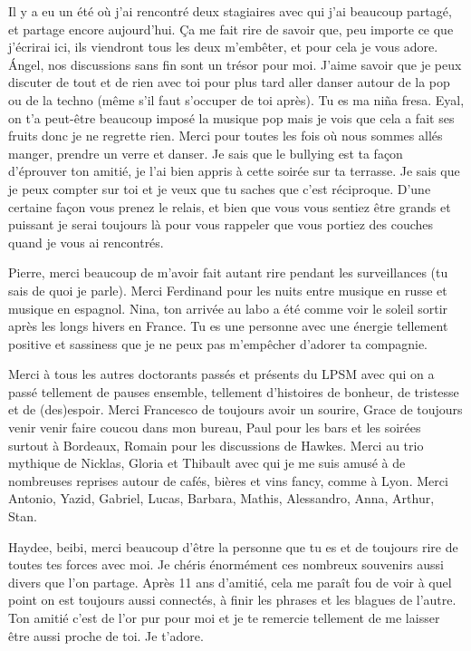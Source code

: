 Il y a eu un été où j’ai rencontré deux stagiaires avec qui j’ai beaucoup partagé, et partage encore aujourd’hui. Ça me fait rire de savoir que, peu importe ce que j’écrirai ici, ils viendront tous les deux m’embêter, et pour cela je vous adore. Ángel, nos discussions sans fin sont un trésor pour moi. J’aime savoir que je peux discuter de tout et de rien avec toi pour plus tard aller danser autour de la pop ou de la techno (même s’il faut s’occuper de toi après). Tu es ma niña fresa. Eyal, on t’a peut-être beaucoup imposé la musique pop mais je vois que cela a fait ses fruits donc je ne regrette rien. Merci pour toutes les fois où nous sommes allés manger, prendre un verre et danser. Je sais que le bullying est ta façon d’éprouver ton amitié, je l’ai bien appris à cette soirée sur ta terrasse. Je sais que je peux compter sur toi et je veux que tu saches que c’est réciproque.
D’une certaine façon vous prenez le relais, et bien que vous vous sentiez être grands et puissant je serai toujours là pour vous rappeler que vous portiez des couches quand je vous ai rencontrés.

Pierre, merci beaucoup de m’avoir fait autant rire pendant les surveillances (tu sais de quoi je parle). Merci Ferdinand pour les nuits entre musique en russe et musique en espagnol. Nina, ton arrivée au labo a été comme voir le soleil sortir après les longs hivers en France. Tu es une personne avec une énergie tellement positive et sassiness que je ne peux pas m’empêcher d’adorer ta compagnie.

Merci à tous les autres doctorants passés et présents du LPSM avec qui on a passé tellement de pauses ensemble, tellement d’histoires de bonheur, de tristesse et de (des)espoir. Merci Francesco de toujours avoir un sourire, Grace de toujours venir venir faire coucou dans mon bureau, Paul pour les bars et les soirées surtout à Bordeaux, Romain pour les discussions de Hawkes. Merci au trio mythique de Nicklas, Gloria et Thibault avec qui je me suis amusé à de nombreuses reprises autour de cafés, bières et vins fancy, comme à Lyon. Merci Antonio, Yazid, Gabriel, Lucas, Barbara, Mathis, Alessandro, Anna, Arthur, Stan.

Haydee, beibi, merci beaucoup d’être la personne que tu es et de toujours rire de toutes tes forces avec moi. Je chéris énormément ces nombreux souvenirs aussi divers que l’on partage. Après 11 ans d’amitié, cela me paraît fou de voir à quel point on est toujours aussi connectés, à finir les phrases et les blagues de l’autre. Ton amitié c’est de l’or pur pour moi et je te remercie tellement de me laisser être aussi proche de toi. Je t’adore.

